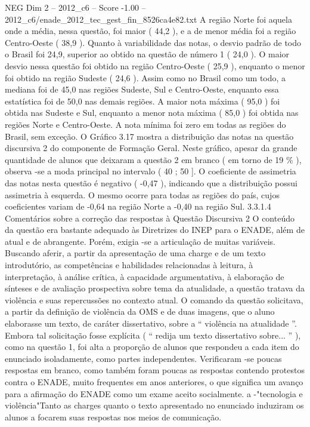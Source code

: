 \begin{textsample}{NEG Dim 2 – 2012\_c6 – Score -1.00 – 2012\_c6/enade\_2012\_tec\_gest\_fin\_8526ca4e82.txt}
A região Norte foi aquela onde a média, nessa questão, foi maior ( 44,2 ), e a de menor média foi a região Centro-Oeste ( 38,9 ).
Quanto à variabilidade das notas, o desvio padrão de todo o Brasil foi 24,9, superior ao obtido na questão de número 1 ( 24,0 ).
O maior desvio nessa questão foi obtido na região Centro-Oeste ( 25,9 ), enquanto o menor foi obtido na região Sudeste ( 24,6 ).
Assim como no Brasil como um todo, a mediana foi de 45,0 nas regiões Sudeste, Sul e Centro-Oeste, enquanto essa estatística foi de 50,0 nas demais regiões.
A maior nota máxima ( 95,0 ) foi obtida nas Sudeste e Sul, enquanto a menor nota máxima ( 85,0 ) foi obtida nas regiões Norte e Centro-Oeste.
A nota mínima foi zero em todas as regiões do Brasil, sem exceção.
O Gráfico 3.17 mostra a distribuição das notas na questão discursiva 2 do componente de Formação Geral.
Neste gráfico, apesar da grande quantidade de alunos que deixaram a questão 2 em branco ( em torno de 19 \% ), observa -se a moda principal no intervalo ( 40 ; 50 ].
O coeficiente de assimetria das notas nesta questão é negativo ( -0,47 ), indicando que a distribuição possui assimetria à esquerda.
O mesmo ocorre para todas as regiões do país, cujos coeficientes variam de -0,64 na região Norte a -0,40 na região Sul. 3.3.1.4 Comentários sobre a correção das respostas à Questão Discursiva 2 O conteúdo da questão era bastante adequado às Diretrizes do INEP para o ENADE, além de atual e de abrangente.
Porém, exigia -se a articulação de muitas variáveis.
Buscando aferir, a partir da apresentação de uma charge e de um texto introdutório, as competências e habilidades relacionadas à leitura, à interpretação, à análise crítica, à capacidade argumentativa, à elaboração de sínteses e de avaliação prospectiva sobre tema da atualidade, a questão tratava da violência e suas repercussões no contexto atual.
O comando da questão solicitava, a partir da definição de violência da OMS e de duas imagens, que o aluno elaborasse um texto, de caráter dissertativo, sobre a “ violência na atualidade ”.
Embora tal solicitação fosse explícita ( “ redija um texto dissertativo sobre... ” ), como na questão 1, foi alta a proporção de alunos que respondeu a cada item do enunciado isoladamente, como partes independentes.
Verificaram -se poucas respostas em branco, como também foram poucas as respostas contendo protestos contra o ENADE, muito frequentes em anos anteriores, o que significa um avanço para a afirmação do ENADE como um exame aceito socialmente. a -"tecnologia e violência"Tanto as charges quanto o texto apresentado no enunciado induziram os alunos a focarem suas respostas nos meios de comunicação.

\end{textsample}
